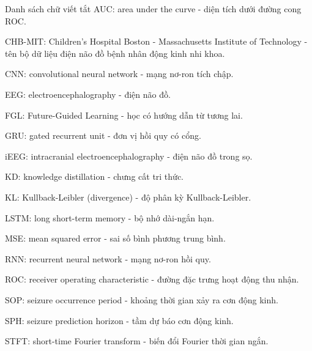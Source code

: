 \begin{contentlistingsection}{Danh sách chữ viết tắt}
AUC: area under the curve - diện tích dưới đường cong ROC.

CHB-MIT: Children's Hospital Boston - Massachusetts Institute of Technology - tên bộ dữ liệu điện não đồ bệnh nhân động kinh nhi khoa.

CNN: convolutional neural network - mạng nơ-ron tích chập.

EEG: electroencephalography - điện não đồ.

FGL: Future-Guided Learning - học có hướng dẫn từ tương lai.

GRU: gated recurrent unit - đơn vị hồi quy có cổng.

iEEG: intracranial electroencephalography - điện não đồ trong sọ.

KD: knowledge distillation - chưng cất tri thức.

KL: Kullback-Leibler (divergence) - độ phân kỳ Kullback-Leibler.

LSTM: long short-term memory - bộ nhớ dài-ngắn hạn.

MSE: mean squared error - sai số bình phương trung bình.

RNN: recurrent neural network - mạng nơ-ron hồi quy.

ROC: receiver operating characteristic - đường đặc trưng hoạt động thu nhận.

SOP: seizure occurrence period - khoảng thời gian xảy ra cơn động kinh.

SPH: seizure prediction horizon - tầm dự báo cơn động kinh.

STFT: short-time Fourier transform - biến đổi Fourier thời gian ngắn.
\end{contentlistingsection}
